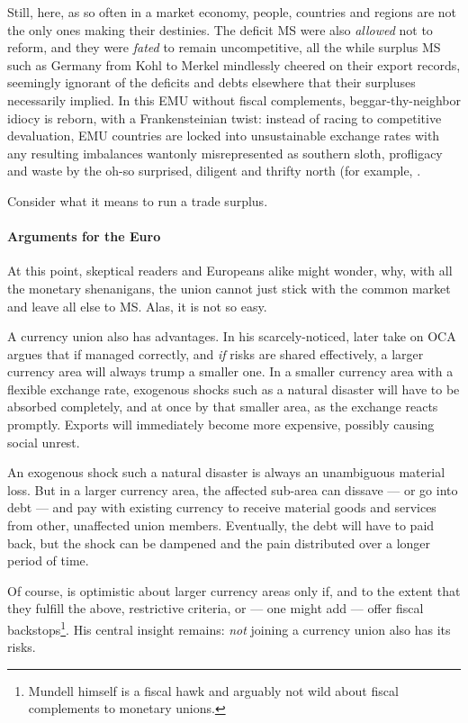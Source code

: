 Still, here, as so often in a market economy, people, countries and regions are not the only ones making their destinies.
The deficit \gls{MS} were also \emph{allowed} not to reform, and they were \emph{fated} to remain uncompetitive, all the while surplus \gls{MS} such as Germany from Kohl to Merkel mindlessly cheered on their export records, seemingly ignorant of the deficits and debts elsewhere that their surpluses necessarily implied.
In this \gls{EMU} without fiscal complements, beggar-thy-neighbor idiocy is reborn, with a Frankensteinian twist:
instead of racing to competitive devaluation, \gls{EMU} countries are locked into unsustainable exchange rates with any resulting imbalances wantonly misrepresented as southern sloth, profligacy and waste by the oh-so surprised, diligent and thrifty north (for example, \citep[200]{Featherstone2011}.

Consider what it means to run a trade surplus.

\paragraph{Arguments for the Euro} At this point, skeptical readers and Europeans alike might wonder, why, with all the monetary shenanigans, the union cannot just stick with the common market and leave all else to \gls{MS}.
Alas, it is not so easy.

A currency union also has advantages.
In his scarcely-noticed, later take on \gls{OCA} \cite{Mundell1972} argues that if managed correctly, and \emph{if} risks are shared effectively, a larger currency area will always trump a smaller one.
In a smaller currency area with a flexible exchange rate, exogenous shocks such as a natural disaster will have to be absorbed completely, and at once by that smaller area, as the exchange reacts promptly.
Exports will immediately become more expensive, possibly causing social unrest.

An exogenous shock such a natural disaster is always an unambiguous material loss.
But in a larger currency area, the affected sub-area can dissave --- or go into debt --- and pay with existing currency to receive material goods and services from other, unaffected union members.
Eventually, the debt will have to paid back, but the shock can be dampened and the pain distributed over a longer period of time.

Of course, \cite{Mundell1972} is optimistic about larger currency areas only if, and to the extent that they fulfill the above, restrictive criteria, or --- one might add --- offer fiscal backstops\footnote{
	Mundell himself is a fiscal hawk and arguably not wild about fiscal complements to monetary unions.}.
His central insight remains:
\emph{not} joining a currency union also has its risks.

